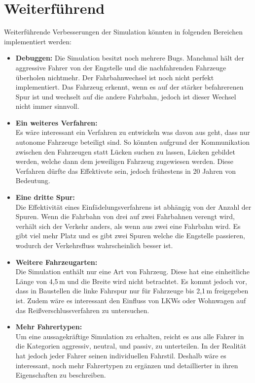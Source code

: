 \chapter{Weiterführend}
Weiterführende Verbesserungen der Simulation könnten in folgenden Bereichen implementiert werden:
\begin{itemize}
	\item \textbf{Debuggen:}
Die Simulation besitzt noch mehrere Bugs. Manchmal hält der aggressive Fahrer von der Engstelle und die nachfahrenden Fahrzeuge überholen nichtmehr.
Der Fahrbahnwechsel ist noch nicht perfekt implementiert. Das Fahrzeug erkennt, wenn es auf der stärker befahrerenen Spur ist und wechselt auf die andere Fahrbahn, jedoch ist dieser Wechsel nicht immer sinnvoll.
\item \textbf{Ein weiteres Verfahren:}\\
Es wäre interessant ein Verfahren zu entwickeln was davon aus geht, dass nur autonome Fahrzeuge beteiligt sind. So könnten aufgrund der Kommunikation zwischen den Fahrzeugen statt Lücken suchen zu lassen, Lücken  gebildet werden, welche dann dem jeweiligen Fahrzeug zugewiesen werden. Diese Verfahren dürfte das Effektivste sein, jedoch frühestens in 20 Jahren von Bedeutung.

\item \textbf{Eine dritte Spur:}\\
Die Effektivität eines Einfädelungsverfahrens ist abhängig von der Anzahl der Spuren. Wenn die Fahrbahn von drei auf zwei Fahrbahnen verengt wird, verhält sich der Verkehr anders, als wenn aus zwei eine Fahrbahn wird. Es gibt viel mehr Platz und es gibt zwei Spuren welche die Engstelle passieren, wodurch der Verkehrsfluss wahrscheinlich besser ist.

\item \textbf{Weitere Fahrzeugarten:}\\
Die Simulation enthält nur eine Art von Fahrzeug. Diese hat eine einheitliche Länge von 4,5\,m und die Breite wird nicht betrachtet. Es kommt jedoch vor, dass in Baustellen die linke Fahrspur nur für Fahrzeuge bis 2,1\,m freigegeben ist.
Zudem wäre es interessant den Einfluss von LKWs oder Wohnwagen auf das Reißverschlussverfahren zu untersuchen.

\item \textbf{Mehr Fahrertypen:}\\
Um eine aussagekräftige Simulation zu erhalten, reicht es aus alle Fahrer in die Kategorien aggressiv, neutral, und passiv, zu unterteilen. In der Realität hat jedoch jeder Fahrer seinen individuellen Fahrstil. Deshalb wäre es interessant, noch mehr Fahrertypen zu ergänzen und detaillierter in ihren Eigenschaften zu beschreiben.


\end{itemize}

